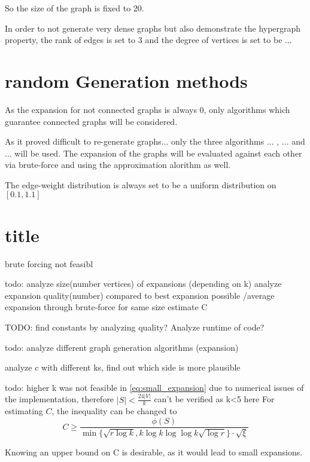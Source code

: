 So the size of the graph is fixed to 20.




In order to not generate very dense graphs but also demonstrate the hypergraph property, the rank of edges is set to 3 and the degree of vertices is set to be ... 




\section{random Generation methods}

As the expansion for not connected graphs is always 0, only algorithms which guarantee connected graphs will be considered.

As it proved difficult to re-generate graphs... only the three algorithms ... , ... and ... will be used. The expansion of the graphs will be evaluated against each other via brute-force and using the approximation alorithm as well.


The edge-weight distribution is always set to be a uniform distribution on $[0.1, 1.1]$
\section{title}

brute forcing not feasibl

todo: analyze size(number vertices) of expansions (depending on k)
analyze expansion quality(number) compared to best expansion possible /average expansion through brute-force for same size
estimate C



TODO: find constants by analyzing quality?
Analyze runtime of code? 

todo: analyze different graph generation algorithms (expansion)

analyze c with different ks, find out which side is more plausible


todo: higher k was not feasible in \cref{eq:small_expansion} due to numerical issues of the implementation, therefore $|S|<\frac{24|V|}{k}$ can't be verified as k<5 here
For estimating $C$, the inequality can be changed to
\begin{equation}
 C\ge \frac {\phi(S)}{ \min\{\sqrt{r \log k}, k \log k  \log \log k \sqrt{\log r} \} \cdot \sqrt{\xi}}
\end{equation}

Knowing an upper bound on C is desirable, as it would lead to small expansions.